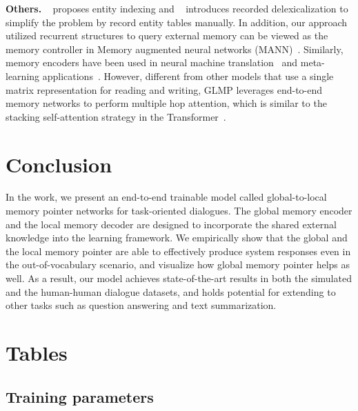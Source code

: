 \documentclass{article} \usepackage{iclr2019_conference,times}
\begin{document}
\textbf{Others.}
~\cite{zhao2017generative} proposes entity indexing and ~\cite{dqmem8461426} introduces recorded delexicalization to simplify the problem by record entity tables manually. In addition, our approach utilized recurrent structures to query external memory can be viewed as the memory controller in Memory augmented neural networks (MANN)~\citep{graves2014neural, graves2016hybrid}. Similarly, memory encoders have been used in neural machine translation~\citep{wangEtAl2016} and meta-learning applications~\citep{KaiserNRB17}. However, different from other models that use a single matrix representation for reading and writing, GLMP leverages end-to-end memory networks to perform multiple hop attention, which is similar to the stacking self-attention strategy in the Transformer~\citep{vaswani2017attention}. 


\section{Conclusion}
In the work, we present an end-to-end trainable model called global-to-local memory pointer networks for task-oriented dialogues. The global memory encoder and the local memory decoder are designed to incorporate the shared external knowledge into the learning framework. We empirically show that the global and the local memory pointer are able to effectively produce system responses even in the out-of-vocabulary scenario, and visualize how global memory pointer helps as well. As a result, our model achieves state-of-the-art results in both the simulated and the human-human dialogue datasets, and holds potential for extending to other tasks such as question answering and text summarization.






\newpage
\appendix
\section{Tables}

\subsection{Training parameters}
\end{document}
